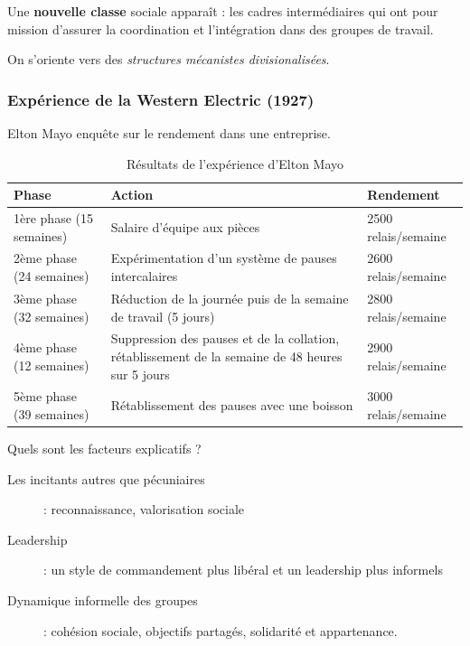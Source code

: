 \documentclass[12pt]{article}
\begin{document}
	  Une \textbf{nouvelle classe} sociale apparaît : les cadres intermédiaires qui ont pour mission d'assurer la coordination et l'intégration dans des groupes de travail.
	  
	  On s'oriente vers des \emph{structures mécanistes divisionalisées}.
	  
	  \subsubsection{Expérience de la Western Electric (1927)}
	  
	  Elton Mayo enquête sur le rendement dans une entreprise.
	  
	  \begin{table}[!ht]
	        \begin{tabular}{p{4.7cm}|p{7.3cm}|p{3.5cm}}
		Phase & Action & Rendement \\
		\hline \hline
		1ère phase (15 semaines) & Salaire d'équipe aux pièces & 2500 relais/semaine \\ \hline
		2ème phase (24 semaines) & Expérimentation d'un système de pauses intercalaires & 2600 relais/semaine \\ \hline
		3ème phase (32 semaines) & Réduction de la journée puis de la semaine de travail (5 jours) & 2800 relais/semaine \\ \hline
		4ème phase (12 semaines) & Suppression des pauses et de la collation, rétablissement de la semaine de 48 heures sur 5 jours & 2900 relais/semaine \\ \hline
		5ème phase (39 semaines) & Rétablissement des pauses avec une boisson & 3000 relais/semaine \\ \hline
	    \end{tabular}
	    \caption{Résultats de l'expérience d'Elton Mayo}
	  \end{table}
	  
	  Quels sont les facteurs explicatifs ?
	  
	  \begin{description}
	   \item[Les incitants autres que pécuniaires] : reconnaissance, valorisation sociale
	   \item[Leadership] : un style de commandement plus libéral et un leadership plus informels
	   \item[Dynamique informelle des groupes] : cohésion sociale, objectifs partagés, solidarité et appartenance.
	  \end{description}
	  
\end{document}
